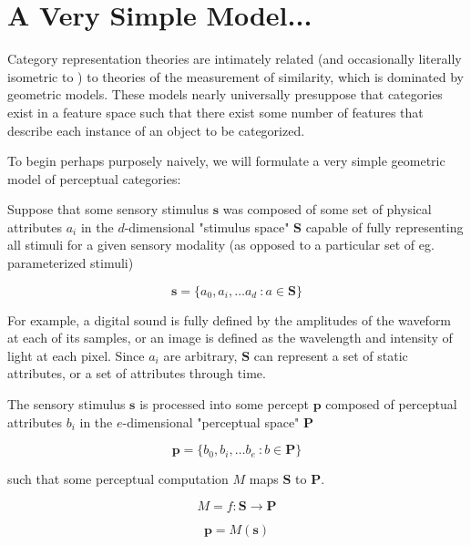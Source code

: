 \section{A Very Simple Model...}

Category representation theories are intimately related (and occasionally literally isometric to \citep{Edelman1998}) to theories of the measurement of similarity, which is dominated by geometric models\citep{Tversky1977}. These models nearly universally presuppose that categories exist in a feature space such that there exist some number of features that describe each instance of an object to be categorized.

To begin perhaps purposely naively, we will formulate a very simple geometric model of perceptual categories:

Suppose that some sensory stimulus $\mathbf{s}$ was composed of some set of physical attributes $a_i$ in the $d$-dimensional "stimulus space" $\mathbf{S}$ capable of fully representing all stimuli for a given sensory modality (as opposed to a particular set of eg. parameterized stimuli)

\begin{equation}
\label{eqn:s}
\mathbf{s} = \{a_0, a_i, \dots a_d\ : a \in \mathbf{S}\}
\end{equation}

For example, a digital sound is fully defined by the amplitudes of the waveform at each of its samples, or an image is defined as the wavelength and intensity of light at each pixel.  Since $a_i$ are arbitrary, $\mathbf{S}$ can represent a set of static attributes, or a set of attributes through time.

The sensory stimulus $\mathbf{s}$ is processed into some percept $\mathbf{p}$ composed of perceptual attributes $b_i$ in the $e$-dimensional "perceptual space" $\mathbf{P}$

\begin{equation}
\label{eqn:p}
\mathbf{p} = \{b_0, b_i, \dots b_e\ : b \in \mathbf{P}\}
\end{equation}

such that some perceptual computation $M$ maps $\mathbf{S}$ to $\mathbf{P}$.

\begin{equation}
\label{eqn:map}
M = f: \mathbf{S} \to \mathbf{P}
\end{equation} 

\begin{equation}
\label{eqn:pfroms}
\mathbf{p} = M(\mathbf{s})
\end{equation}

